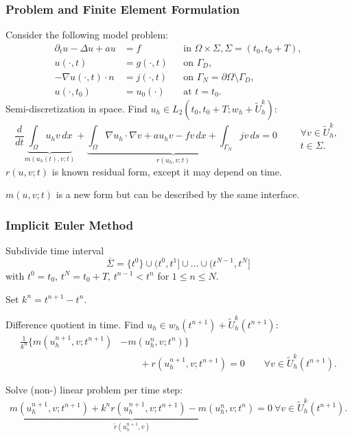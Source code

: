 \begin{frame}
\frametitle{Problem and Finite Element Formulation}
Consider the following model problem:
\begin{subequations} \label{Eq:Example03}
\begin{align*}
\partial_t u -\Delta u + a u &= f &&\text{in $\Omega\times\Sigma$}, \Sigma=(t_0,t_0+T),\\
u(\cdot,t) &= g(\cdot,t) && \text{on $\Gamma_D$},\\
-\nabla u(\cdot,t) \cdot n &= j(\cdot,t) &&\text{on $\Gamma_N=\partial\Omega\setminus\Gamma_D$},\\
u(\cdot,t_0) &= u_0(\cdot) && \text{at $t=t_0$}.
\end{align*}
\end{subequations}
Semi-discretization in space. Find $u_h\in L_2(t_0,t_0+T;w_h+\tilde{U}_h^k)$:
\begin{equation*}
\frac{d}{dt} \underbrace{\int_\Omega u_h v \,dx}_{m(u_h(t),v;t)} + \underbrace{\int_\Omega \nabla u_h \cdot \nabla v
+ a u_h v - f v \, dx + \int_{\Gamma_N} jv \, ds}_{r(u_h,v;t)} = 0 \qquad
\begin{array}{l}
\forall v \in \tilde{U}_h^k,\\
t \in \Sigma.
\end{array}
\end{equation*}
$r(u,v;t)$ is known residual form, except it may depend on time.

$m(u,v;t)$ is a new form but can be described by the same interface.
\end{frame}

\begin{frame}
\frametitle{Implicit Euler Method}
Subdivide time interval
\begin{equation*}
\overline{\Sigma} = \{t^{0}\} \cup (t^0,t^1] \cup \ldots \cup (t^{N-1},t^N]
\end{equation*}
with $t^0=t_0$, $t^N=t_0+T$, $t^{n-1}<t^n$ for $1\leq n\leq N$.

Set $k^n=t^{n+1}-t^n$.

Difference quotient in time. Find $u_h \in w_h(t^{n+1}) + \tilde{U}_h^k(t^{n+1})$:
\begin{equation*}
\begin{split}
\frac{1}{k^n} \bigl\{ m\left(u_h^{n+1},v;t^{n+1}\right) &- m\left(u_h^{n},v;t^{n}\right)\bigr\} \\
&\qquad + r\left(u_h^{n+1},v;t^{n+1}\right) = 0
\qquad  \forall v \in \tilde{U}_h^k(t^{n+1}).
\end{split}
\end{equation*}

Solve (non-) linear problem per time step:
\begin{equation*}
\begin{split}
\underbrace{m\left(u_h^{n+1},v;t^{n+1}\right) + k^n r\left(u_h^{n+1},v;t^{n+1}\right)
 - m\left(u_h^{n},v;t^{n}\right)}_{\tilde{r}(u_h^{n+1},v)} = 0 \ \forall v \in \tilde{U}_h^k(t^{n+1}).
\end{split}
\end{equation*}
\end{frame}



